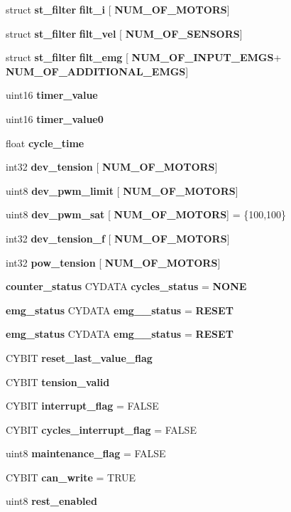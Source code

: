 \begin{DoxyCompactItemize}
\item 
struct \textbf{ st\+\_\+filter} \textbf{ filt\+\_\+i} [\textbf{ N\+U\+M\+\_\+\+O\+F\+\_\+\+M\+O\+T\+O\+RS}]
\item 
struct \textbf{ st\+\_\+filter} \textbf{ filt\+\_\+vel} [\textbf{ N\+U\+M\+\_\+\+O\+F\+\_\+\+S\+E\+N\+S\+O\+RS}]
\item 
struct \textbf{ st\+\_\+filter} \textbf{ filt\+\_\+emg} [\textbf{ N\+U\+M\+\_\+\+O\+F\+\_\+\+I\+N\+P\+U\+T\+\_\+\+E\+M\+GS}+\textbf{ N\+U\+M\+\_\+\+O\+F\+\_\+\+A\+D\+D\+I\+T\+I\+O\+N\+A\+L\+\_\+\+E\+M\+GS}]
\item 
uint16 \textbf{ timer\+\_\+value}
\item 
uint16 \textbf{ timer\+\_\+value0}
\item 
float \textbf{ cycle\+\_\+time}
\item 
int32 \textbf{ dev\+\_\+tension} [\textbf{ N\+U\+M\+\_\+\+O\+F\+\_\+\+M\+O\+T\+O\+RS}]
\item 
uint8 \textbf{ dev\+\_\+pwm\+\_\+limit} [\textbf{ N\+U\+M\+\_\+\+O\+F\+\_\+\+M\+O\+T\+O\+RS}]
\item 
uint8 \textbf{ dev\+\_\+pwm\+\_\+sat} [\textbf{ N\+U\+M\+\_\+\+O\+F\+\_\+\+M\+O\+T\+O\+RS}] = \{100,100\}
\item 
int32 \textbf{ dev\+\_\+tension\+\_\+f} [\textbf{ N\+U\+M\+\_\+\+O\+F\+\_\+\+M\+O\+T\+O\+RS}]
\item 
int32 \textbf{ pow\+\_\+tension} [\textbf{ N\+U\+M\+\_\+\+O\+F\+\_\+\+M\+O\+T\+O\+RS}]
\item 
\textbf{ counter\+\_\+status} C\+Y\+D\+A\+TA \textbf{ cycles\+\_\+status} = \textbf{ N\+O\+NE}
\item 
\textbf{ emg\+\_\+status} C\+Y\+D\+A\+TA \textbf{ emg\+\_\+\_\+status} = \textbf{ R\+E\+S\+ET}
\item 
\textbf{ emg\+\_\+status} C\+Y\+D\+A\+TA \textbf{ emg\+\_\+\_\+status} = \textbf{ R\+E\+S\+ET}
\item 
C\+Y\+B\+IT \textbf{ reset\+\_\+last\+\_\+value\+\_\+flag}
\item 
C\+Y\+B\+IT \textbf{ tension\+\_\+valid}
\item 
C\+Y\+B\+IT \textbf{ interrupt\+\_\+flag} = F\+A\+L\+SE
\item 
C\+Y\+B\+IT \textbf{ cycles\+\_\+interrupt\+\_\+flag} = F\+A\+L\+SE
\item 
uint8 \textbf{ maintenance\+\_\+flag} = F\+A\+L\+SE
\item 
C\+Y\+B\+IT \textbf{ can\+\_\+write} = T\+R\+UE
\item 
uint8 \textbf{ rest\+\_\+enabled}

\end{DoxyCompactItemize}
